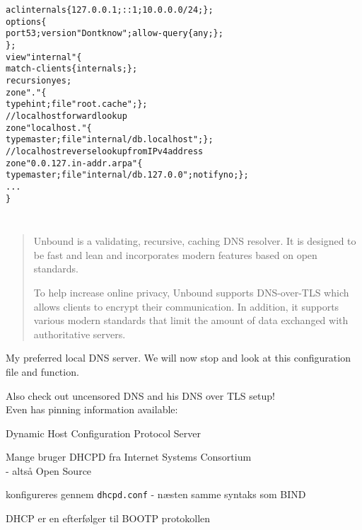 \documentclass[Screen16to9,17pt]{foils}
\begin{document}
\begin{alltt}\small
acl internals \{ 127.0.0.1; ::1; 10.0.0.0/24; \};
options \{
        port 53; version "Dont know"; allow-query \{ any; \};
\};
view "internal" \{
   match-clients \{ internals; \};
   recursion yes;
   zone "." \{
       type hint;   file "root.cache"; \};
   // localhost forward lookup
   zone "localhost." \{
        type master; file "internal/db.localhost";   \};
   // localhost reverse lookup from IPv4 address
   zone "0.0.127.in-addr.arpa" \{
        type master; file "internal/db.127.0.0"; notify no;   \};
...
\}
\end{alltt}



\inputminted{bash}{programs/bind-version}


\inputminted{perl}{programs/dns-timecheck}


\begin{quote}
Unbound is a validating, recursive, caching DNS resolver. It is designed to be fast and lean and incorporates modern features based on open standards.

To help increase online privacy, Unbound supports DNS-over-TLS which allows clients to encrypt their communication. In addition, it supports various modern standards that limit the amount of data exchanged with authoritative servers.
\end{quote}


My preferred local DNS server. We will now stop and look at this configuration file and function.

Also check out uncensored DNS and his DNS over TLS setup!\\
Even has pinning information available:\\ {\small{}}


\begin{list1}
\item Dynamic Host Configuration Protocol Server
\item Mange bruger DHCPD fra Internet Systems Consortium\\
   - altså Open Source
\item konfigureres gennem \verb+dhcpd.conf+ - næsten samme syntaks som BIND
\item DHCP er en efterfølger til BOOTP protokollen
\end{list1}
\end{document}
